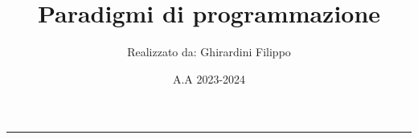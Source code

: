 \documentclass[a4paper,10pt]{article}
\title{\textbf{Paradigmi di programmazione}}
\author{Realizzato da: Ghirardini Filippo}
\date{A.A 2023-2024}
\theoremstyle{definition}
\theoremstyle{definition}
\theoremstyle{definition}
\theoremstyle{plain}
\begin{document}
	
	\tableofcontents
	
	\begin{center}
		\vspace{-20pt}
		\rule{11cm}{.1pt} 
	\end{center}
	
	
	
\end{document}
